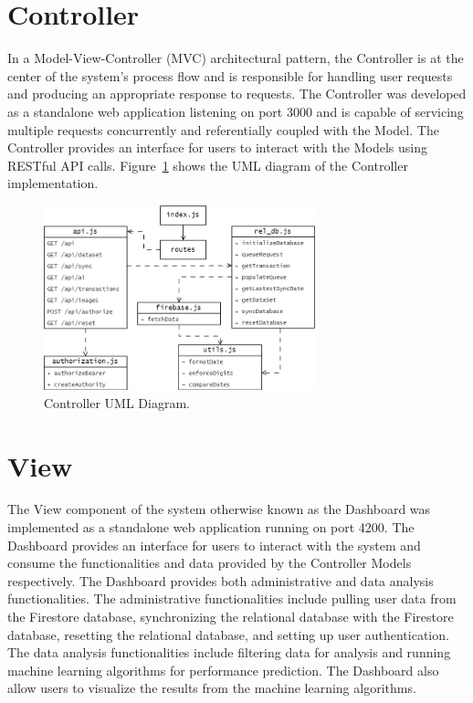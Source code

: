 \section{Controller}
In a Model-View-Controller (MVC) architectural pattern, the Controller is at the center of the system's process flow and is responsible for 
handling user requests and producing an appropriate response to requests. The Controller was developed as a standalone web application
listening on port 3000 and is capable of servicing multiple requests concurrently and referentially coupled with the Model. The Controller
provides an interface for users to interact with the Models using RESTful API calls. Figure~\ref{image:uml_controller} shows the UML diagram of the 
Controller implementation.
\begin{figure}[h!]
    \begin{center}
        \includegraphics[width=0.7\textwidth]{images/uml_controller.png}
        \caption{Controller UML Diagram.}
        \label{image:uml_controller}
    \end{center}
\end{figure}

\section{View}
The View component of the system otherwise known as the Dashboard was implemented as a standalone web application running on port 4200. The 
Dashboard provides an interface for users to interact with the system and consume the functionalities and data provided by the Controller
Models respectively. The Dashboard provides both administrative and data analysis functionalities. The administrative functionalities include
pulling user data from the Firestore database, synchronizing the relational database with the Firestore database, resetting the relational 
database, and setting up user authentication. The data analysis functionalities include filtering data for analysis and running machine learning
algorithms for performance prediction. The Dashboard also allow users to visualize the results from the machine learning algorithms. 

